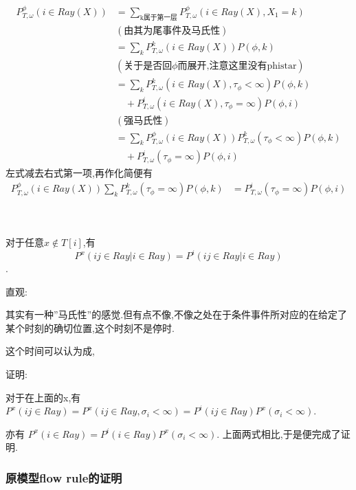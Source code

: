 		 \begin{pf}
		 	\label{r17lem4.3}
		 	\begin{align*}
				P^{\phi}_{T,\omega}(i\in Ray(X)) 
				&= \sum_{\mbox{k属于第一层}}  P^{\phi}_{T,\omega}(i\in Ray(X), X_1=k) \\
				&(\mbox{由其为尾事件及马氏性}) \\
					&= \sum_{k}  P^{k}_{T,\omega}(i\in Ray(X))P(\phi,k) \\
				&(\mbox{关于是否回$\phi$而展开,注意这里没有phistar}) \\
					&= \sum_{k}  P^{k}_{T,\omega}(i\in Ray(X),\tau_{\phi} < \infty)P(\phi,k)\\
					&\quad  + P^{i}_{T,\omega}(i\in Ray(X),\tau_{\phi} = \infty)P(\phi,i) \\
				&(\mbox{强马氏性}) \\
					&= \sum_{k}  P^{\phi}_{T,\omega}(i\in Ray(X)) P^{k}_{T,\omega}(\tau_{\phi} < \infty)P(\phi,k) \\
					&\quad  + P^{i}_{T,\omega}(\tau_{\phi} = \infty)P(\phi,i)
			\end{align*}
			左式减去右式第一项,再作化简便有
			\begin{align*}
				P^{\phi}_{T,\omega}(i\in Ray(X)) \sum_{k} P^{k}_{T,\omega}(\tau_{\phi} = \infty)P(\phi,k) 
					&= P^{i}_{T,\omega}(\tau_{\phi} = \infty)P(\phi,i) \\
			\end{align*}
		 \end{pf}


		 \begin{pro}[起点无关]
		 	\ 

		 	对于任意$x\notin T[i]$,有$$P^x(ij \in Ray | i \in Ray) = P^i(ij \in Ray | i \in Ray)$$.

			直观:

				其实有一种”马氏性”的感觉.但有点不像,不像之处在于条件事件所对应的在给定了某个时刻的确切位置,这个时刻不是停时.

				这个时间可以认为成,

			证明:

				对于在上面的x,有$P^x(ij \in Ray) = P^x(ij \in Ray, \sigma_i < \infty) = P^i(ij \in Ray) P^x(\sigma_i < \infty)$.

			亦有 $P^x(i \in Ray) = P^i(i \in Ray) P^x(\sigma_i < \infty)$. 上面两式相比,于是便完成了证明.

		 \end{pro}

		\subsubsection*{原模型flow rule的证明}


